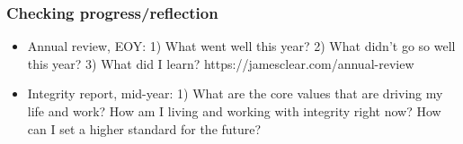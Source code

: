 \begin{frame}[fragile]\frametitle{Checking progress/reflection}
\begin{itemize}
\item Annual review, EOY: 1) What went well this year? 2) What didn’t go so well this year? 3) What did I learn? https://jamesclear.com/annual-review 
\item Integrity report, mid-year: 1) What are the core values that are driving my life and work? How am I living and working with integrity right now? How can I set a higher standard for the future? 
\end{itemize}
\end{frame}


